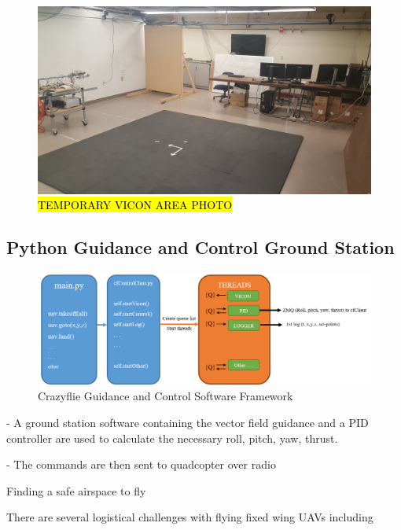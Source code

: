 \documentclass[numbered,pdftex]{ohio-etd}
\begin{document}
\begin{figure}[H]
	\centering
	\includegraphics[trim=0 0 0 0,clip,width=14cm]{PaperFigures/Methods/viconArea}
	\caption{\hl{TEMPORARY VICON AREA PHOTO}}
	\label{fig:cfControlClass}
\end{figure}




\subsection{Python Guidance and Control Ground Station}

\begin{figure}[H]
	\centering
	\includegraphics[trim=10 0 10 0,clip,width=14cm]{PaperFigures/Methods/cfControlClassFlow}
	\caption{Crazyflie Guidance and Control Software Framework}
	\label{fig:cfControlClass}
\end{figure}




- A ground station software containing the vector field guidance and a PID controller are used to calculate the necessary roll, pitch, yaw, thrust.

- The commands are then sent to quadcopter over radio

Finding a safe airspace to fly 

There are several logistical challenges with flying fixed wing UAVs including 
\end{document}
